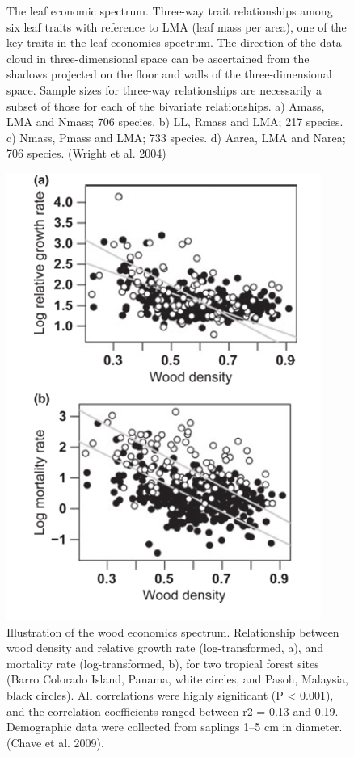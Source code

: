 \documentclass[12pt,oneside]{book}
\begin{document}
\begin{figure}
{}

\caption{The leaf economic spectrum. Three-way trait relationships among six leaf traits with reference to LMA (leaf mass per area), one of the key traits in the leaf economics spectrum. The direction of the data cloud in three-dimensional space can be ascertained from the shadows projected on the floor and walls of the three-dimensional space. Sample sizes for three-way relationships are necessarily a subset of those for each of the bivariate relationships. a) Amass, LMA and Nmass; 706 species. b) LL, Rmass and LMA; 217 species. c) Nmass, Pmass and LMA; 733 species. d) Aarea, LMA and Narea; 706 species. (Wright et al. 2004)}\label{fig:f75}
\end{figure}

\begin{figure}

{\centering \includegraphics[width=0.8\linewidth]{figures/chap7/f76_WES} 

}

\caption{Illustration of the wood economics spectrum. Relationship between wood density and relative growth rate (log-transformed, a), and mortality rate (log-transformed, b), for two tropical forest sites (Barro Colorado Island, Panama, white circles, and Pasoh, Malaysia, black circles). All correlations were highly significant (P < 0.001), and the correlation coefficients ranged between r2 = 0.13 and 0.19. Demographic data were collected from saplings 1–5 cm in diameter. (Chave et al. 2009).}\label{fig:f76}
\end{figure}
\end{document}
